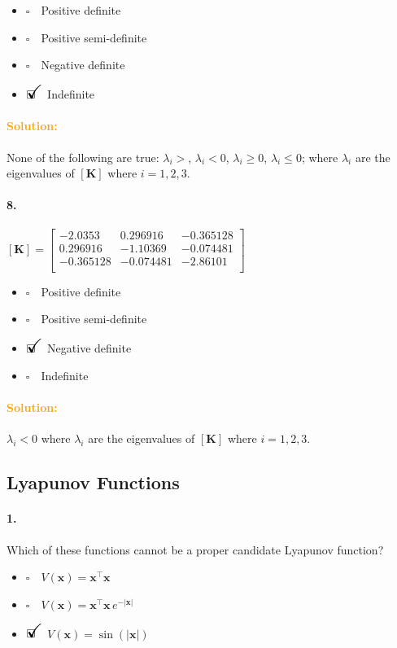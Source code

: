 \documentclass[12pt, a4paper]{article}
\newcommand{\ans}{\item[]$\rlap{\LARGE{\checkmark}}\square\quad$}
\newcommand{\noans}{\item[]$\square\quad$}
\begin{document}
\begin{itemize}
\noans Positive definite
\noans Positive semi-definite
\noans Negative definite
\ans Indefinite
\end{itemize}

\paragraph{\textcolor{orange}{Solution:}} None of the following are true: $\lambda_{i}>$, $\lambda_{i}<0$, $\lambda_{i}\geq0$, $\lambda_{i}\leq0$; where $\lambda_{i}$ are the eigenvalues of $[\bm{K}]$ where $i=1,2,3$.

\paragraph{8.}
$[\bm{K}] = 
\begin{bmatrix}
-2.0353 & 0.296916 & -0.365128 \\
0.296916 & -1.10369 & -0.074481 \\
-0.365128 & -0.074481 & -2.86101 \\
\end{bmatrix}
$

\begin{itemize}
\noans Positive definite
\noans Positive semi-definite
\ans Negative definite
\noans Indefinite
\end{itemize}

\paragraph{\textcolor{orange}{Solution:}} $\lambda_{i}<0$ where $\lambda_{i}$ are the eigenvalues of $[\bm{K}]$ where $i=1,2,3$.

\newpage
\subsection{Lyapunov Functions}
\paragraph{1.}
Which of these functions cannot be a proper candidate Lyapunov function?

\begin{itemize}
    \noans $V(\bm{x}) = \bm{x}^{\intercal}\bm{x}$
    \noans $V(\bm{x}) = \bm{x}^{\intercal}\bm{x} \, e^{-|\bm{x}|}$
    \ans  $V(\bm{x}) = \sin(|\bm{x}|)$
\end{itemize}
\end{document}

